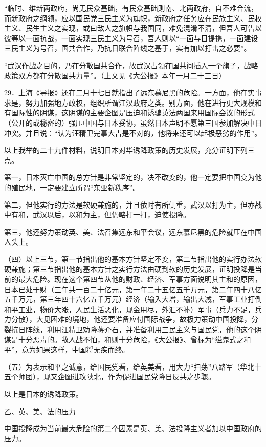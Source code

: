 “临时、维新两政府，尚无民众基础，有民众基础则南、北两政府，自不难合流，而新政府之纲领，应以国民党三民主义为旗帜，新政府之任务应在民族主义、民权主义、民生主义之实现，或曰敌人之旗帜与我国同，难免混淆不清，但吾人可告以彼等以一面抗战，一面实现三民主义为号召，吾人则以“一面与日提携，一面建设三民主义为号召，国共合作，乃抗日联合阵线之基于，实有加以打击之必要”。

“武汉作战之目的，乃在分散国共合作，故武汉占领在国共间插入一个旗子，战略政策双方都在分散国共力量”。（上文见《大公报》本年一月二十三日）

29．上海《导报》还在二月十七日就指出了远东慕尼黑的危险。一方面，他在实事求是，努力加强地方政权，组织所谓江汉政府之类。别方面，他在进行更大规模和有国际性的阴谋，这阴谋的主要企图是压迫和诱骗英法两国来用国际会议的形式（公开的或秘密的）强压中国与日本妥协，虽然日本声明不愿第三国参加解决中日冲突。并且说：“认为汪精卫完事大吉是不对的，他将来还可以起极恶劣的作用”。

以上我举的二十九件材料，说明日本对华诱降政策的历史发展，充分证明下列三点。

第一，日本灭亡中国的总方针是非常坚定的，决不改变的，他一定要把中国变为他的殖民地，一定要建立所谓“东亚新秩序”。

第二，但他实行的方法是软硬兼施的，并且依时有所侧重，武汉以打为主，但亦战中有和，武汉以后，以和为主，但仍略打一打，迫使投降。

第三，他还努力策动英、美、法召集远东和平会议，远东慕尼黑的危险就压在中国人头上。

（四）以上三节，第一节指出他的基本方针坚定不变，第二节指出他的实行办法软硬兼施；第三节指出他的基本方针之实行方法由硬到软的历史发展，证明投降是当前的最大危险。现在这个第四节从他的财政、经济、军事方面说明其主和的原因，日本已处于财（三年共一百二十亿元，第一年二十五亿五千万元，第二年四十八亿五千万元，第三年四十六亿五千万元）经济（输入大增，输出大减，军事工业打倒和平工业，物价大涨，人民生活恶化，现金用尽，外汇不补）军事（兵力不足，兵力分散），大见困难的境地，他还要准备应付国际战争，故极力策动中国投降，分裂抗日阵线，利用汪精卫劝降蒋介石，并准备利用三民主义与国民党，他的这个阴谋是十分恶毒的。敌人战不怕，和则十分危险，《大公报》、曾标为“缢鬼式之和平”，意为如果这样，中国将无疾而终。

（五）为表示和平之诚意，给国民党看，给英美看，用大力“扫荡”八路军（华北十五个师团），现又企图进攻陕北，作为促进国民党降日反共之步骤。

以上是日本的诱降政策。

乙、英、美、法的压力

中国投降成为当前最大危险的第二个因素是英、美、法投降主义者加以中国政府的压力。

